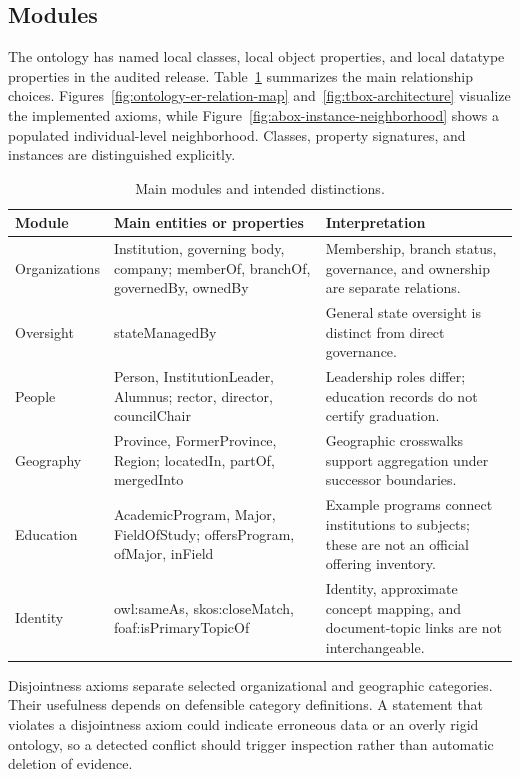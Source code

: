 \documentclass[11pt,a4paper]{article}
\begin{document}
\subsection{Modules}
The ontology has \metricClasses{} named local classes, \metricObjectProperties{} local
object properties, and \metricDataProperties{} local datatype properties in the audited
release. Table~\ref{tab:modules} summarizes the main relationship choices.
Figures~\ref{fig:ontology-er-relation-map} and~\ref{fig:tbox-architecture} visualize the
implemented axioms, while Figure~\ref{fig:abox-instance-neighborhood} shows a populated
individual-level neighborhood. Classes, property signatures, and instances are distinguished
explicitly.
\begin{table}[htbp]\centering\small
\caption{Main modules and intended distinctions.}\label{tab:modules}
\begin{tabularx}{\textwidth}{p{2.6cm}XX}\toprule
Module & Main entities or properties & Interpretation \\\midrule
Organizations & Institution, governing body, company; memberOf, branchOf, governedBy, ownedBy & Membership, branch status, governance, and ownership are separate relations. \\
Oversight & stateManagedBy & General state oversight is distinct from direct governance. \\
People & Person, InstitutionLeader, Alumnus; rector, director, councilChair & Leadership roles differ; education records do not certify graduation. \\
Geography & Province, FormerProvince, Region; locatedIn, partOf, mergedInto & Geographic crosswalks support aggregation under successor boundaries. \\
Education & AcademicProgram, Major, FieldOfStudy; offersProgram, ofMajor, inField & Example programs connect institutions to subjects; these are not an official offering inventory. \\
Identity & owl:sameAs, skos:closeMatch, foaf:isPrimaryTopicOf & Identity, approximate concept mapping, and document-topic links are not interchangeable. \\
\bottomrule\end{tabularx}
\end{table}

Disjointness axioms separate selected organizational and geographic categories. Their
usefulness depends on defensible category definitions. A statement that violates a
disjointness axiom could indicate erroneous data or an overly rigid ontology, so a
detected conflict should trigger inspection rather than automatic deletion of evidence.
\end{document}
